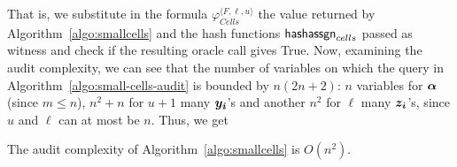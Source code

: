 That is, we substitute in the formula $\varphi^{\langle F,\ell,u\rangle}_{Cells}$ the value returned by Algorithm~\ref{algo:smallcells} and the hash functions $\mathsf{hashassgn}_{cells}$ passed as witness and check if the resulting oracle call gives True. Now, examining the audit complexity, we can see that the number of variables on which the query in Algorithm~\ref{algo:small-cells-audit} is bounded by $n(2n+2)$: $n$ variables for ${\boldsymbol{\alpha}}$ (since $m\leq n$), $n^2+n$ for $u+1$ many ${\boldsymbol{y_i}}$'s and another $n^2$ for $\ell$ many ${\boldsymbol{z_i}}$'s, since $u$ and $\ell$ can at most be $n$. Thus, we get
\begin{corollary}
	The audit complexity of Algorithm~\ref{algo:smallcells} is $O(n^2)$.

\end{corollary}




